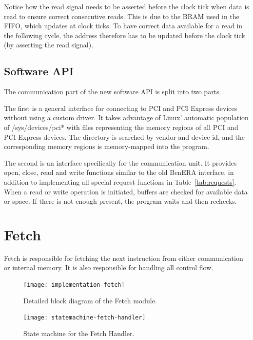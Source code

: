 Notice how the read signal needs to be asserted before the clock tick when data is read to ensure correct consecutive reads.
This is due to the BRAM used in the FIFO, which updates at clock ticks.
To have correct data available for a read in the following cycle, the address therefore has to be updated before the clock tick (by asserting the read signal).

\subsection{Software API}

The communication part of the new software API is split into two parts.

The first is a general interface for connecting to PCI and PCI Express devices without using a custom driver.
It takes advantage of Linux' automatic population of /sys/devices/pci* with files representing the memory regions of all PCI and PCI Express devices.
The directory is searched by vendor and device id, and the corresponding memory regions is memory-mapped into the program.

The second is an interface specifically for the communication unit.
It provides open, close, read and write functions similar to the old BenERA interface, in addition to implementing all special request functions in Table~\ref{tab:requests}.
When a read or write operation is initiated, buffers are checked for available data or space.
If there is not enough present, the program waits and then rechecks.

\section{Fetch}

Fetch is responsible for fetching the next instruction from either communication or internal memory.
It is also responsible for handling all control flow.

\begin{figure}[!ht]
    \centering
    \texttt{[image: implementation-fetch]}
    \caption[Fetch module]{Detailed block diagram of the Fetch module.}
    \label{fig:implementation-fetch}
\end{figure}

\begin{figure}[!ht]
    \centering
    \texttt{[image: statemachine-fetch-handler]}
    \caption[Fetch Handler state machine]{State machine for the Fetch Handler.}
    \label{fig:statemachine-fetch-handler}
\end{figure}

